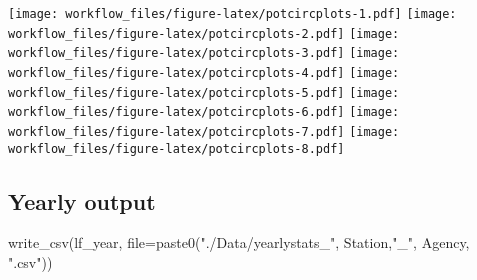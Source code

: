 \documentclass[
]{article}
\newenvironment{Shaded}{\begin{snugshade}}{\end{snugshade}}
\newcommand{\AttributeTok}[1]{\textcolor[rgb]{0.77,0.63,0.00}{#1}}
\newcommand{\DecValTok}[1]{\textcolor[rgb]{0.00,0.00,0.81}{#1}}
\newcommand{\FunctionTok}[1]{\textcolor[rgb]{0.00,0.00,0.00}{#1}}
\newcommand{\NormalTok}[1]{#1}
\newcommand{\OtherTok}[1]{\textcolor[rgb]{0.56,0.35,0.01}{#1}}
\newcommand{\SpecialCharTok}[1]{\textcolor[rgb]{0.00,0.00,0.00}{#1}}
\newcommand{\StringTok}[1]{\textcolor[rgb]{0.31,0.60,0.02}{#1}}
\begin{document}
\begin{Shaded}
\end{Shaded}

\texttt{[image: workflow\_files/figure-latex/potcircplots-1.pdf]}
\texttt{[image: workflow\_files/figure-latex/potcircplots-2.pdf]}
\texttt{[image: workflow\_files/figure-latex/potcircplots-3.pdf]}
\texttt{[image: workflow\_files/figure-latex/potcircplots-4.pdf]}
\texttt{[image: workflow\_files/figure-latex/potcircplots-5.pdf]}
\texttt{[image: workflow\_files/figure-latex/potcircplots-6.pdf]}
\texttt{[image: workflow\_files/figure-latex/potcircplots-7.pdf]}
\texttt{[image: workflow\_files/figure-latex/potcircplots-8.pdf]}

\hypertarget{yearly-output}{%
\subsection{Yearly output}\label{yearly-output}}

\begin{Shaded}
\begin{Highlighting}[]
\FunctionTok{write\_csv}\NormalTok{(lf\_year, }\AttributeTok{file=}\FunctionTok{paste0}\NormalTok{(}\StringTok{"./Data/yearlystats\_"}\NormalTok{, Station,}\StringTok{"\_"}\NormalTok{, Agency, }\StringTok{".csv"}\NormalTok{))}
\end{Highlighting}
\end{Shaded}
\end{document}
